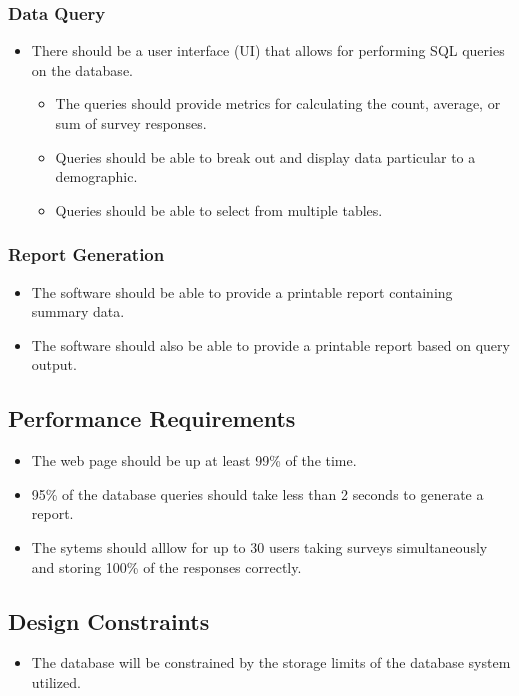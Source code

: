 \documentclass[letterpaper,10pt,titlepage, draftclsnofoot,onecolumn]{IEEEtran}
\begin{document}
\subsubsection{Data Query}
\begin{itemize}
\item There should be a user interface (UI) that allows for performing SQL queries on the database.
	\begin{itemize}
	\item The queries should provide metrics for calculating the count, average, or sum of survey responses.
	\item Queries should be able to break out and display data particular to a demographic.
	\item Queries should be able to select from multiple tables.
	\end{itemize}
\end{itemize}

\subsubsection{Report Generation}
\begin{itemize}
\item The software should be able to provide a printable report containing summary data.
\item The software should also be able to provide a printable report based on query output.
\end{itemize}

\subsection{Performance Requirements}
\begin{itemize}
\item The web page should be up at least 99\% of the time.
\item 95\% of the database queries should take less than 2 seconds to generate a report.
\item The sytems should alllow for up to 30 users taking surveys simultaneously and storing 100\% of the responses correctly.
\end{itemize}

\subsection{Design Constraints}
\begin{itemize}
\item The database will be constrained by the storage limits of the database system utilized.
\end{itemize}
\end{document}
